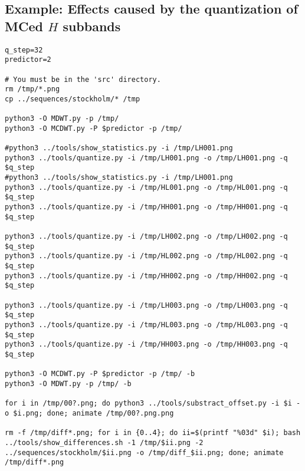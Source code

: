 \subsection*{Example: Effects caused by the quantization of MCed $H$ subbands}
\begin{verbatim}
q_step=32
predictor=2

# You must be in the 'src' directory.
rm /tmp/*.png
cp ../sequences/stockholm/* /tmp

python3 -O MDWT.py -p /tmp/
python3 -O MCDWT.py -P $predictor -p /tmp/

#python3 ../tools/show_statistics.py -i /tmp/LH001.png
python3 ../tools/quantize.py -i /tmp/LH001.png -o /tmp/LH001.png -q $q_step
#python3 ../tools/show_statistics.py -i /tmp/LH001.png
python3 ../tools/quantize.py -i /tmp/HL001.png -o /tmp/HL001.png -q $q_step
python3 ../tools/quantize.py -i /tmp/HH001.png -o /tmp/HH001.png -q $q_step

python3 ../tools/quantize.py -i /tmp/LH002.png -o /tmp/LH002.png -q $q_step
python3 ../tools/quantize.py -i /tmp/HL002.png -o /tmp/HL002.png -q $q_step
python3 ../tools/quantize.py -i /tmp/HH002.png -o /tmp/HH002.png -q $q_step

python3 ../tools/quantize.py -i /tmp/LH003.png -o /tmp/LH003.png -q $q_step
python3 ../tools/quantize.py -i /tmp/HL003.png -o /tmp/HL003.png -q $q_step
python3 ../tools/quantize.py -i /tmp/HH003.png -o /tmp/HH003.png -q $q_step

python3 -O MCDWT.py -P $predictor -p /tmp/ -b
python3 -O MDWT.py -p /tmp/ -b

for i in /tmp/00?.png; do python3 ../tools/substract_offset.py -i $i -o $i.png; done; animate /tmp/00?.png.png

rm -f /tmp/diff*.png; for i in {0..4}; do ii=$(printf "%03d" $i); bash ../tools/show_differences.sh -1 /tmp/$ii.png -2 ../sequences/stockholm/$ii.png -o /tmp/diff_$ii.png; done; animate /tmp/diff*.png
\end{verbatim}

